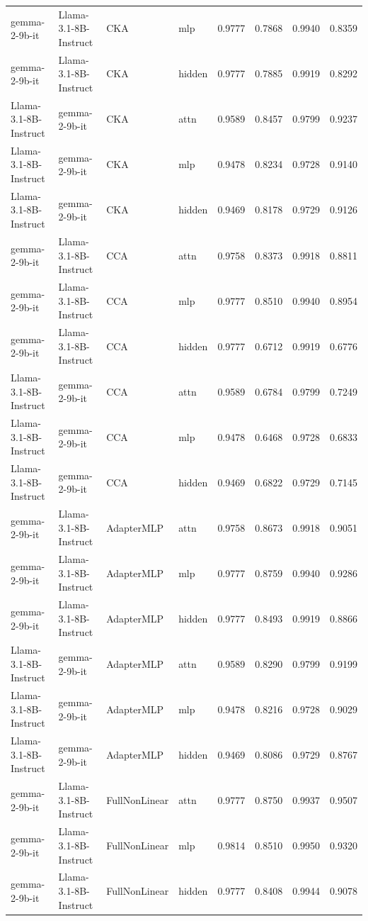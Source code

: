 {\begin{tabularx}{\textwidth}{XXXlcccc}
gemma-2-9b-it & Llama-3.1-8B-Instruct & CKA & mlp & 0.9777 & 0.7868 & 0.9940 & 0.8359 \\
gemma-2-9b-it & Llama-3.1-8B-Instruct & CKA & hidden & 0.9777 & 0.7885 & 0.9919 & 0.8292 \\
Llama-3.1-8B-Instruct & gemma-2-9b-it & CKA & attn & 0.9589 & 0.8457 & 0.9799 & 0.9237 \\
Llama-3.1-8B-Instruct & gemma-2-9b-it & CKA & mlp & 0.9478 & 0.8234 & 0.9728 & 0.9140 \\
Llama-3.1-8B-Instruct & gemma-2-9b-it & CKA & hidden & 0.9469 & 0.8178 & 0.9729 & 0.9126 \\
\midrule
gemma-2-9b-it & Llama-3.1-8B-Instruct & CCA & attn & 0.9758 & 0.8373 & 0.9918 & 0.8811 \\
gemma-2-9b-it & Llama-3.1-8B-Instruct & CCA & mlp & 0.9777 & 0.8510 & 0.9940 & 0.8954 \\
gemma-2-9b-it & Llama-3.1-8B-Instruct & CCA & hidden & 0.9777 & 0.6712 & 0.9919 & 0.6776 \\
Llama-3.1-8B-Instruct & gemma-2-9b-it & CCA & attn & 0.9589 & 0.6784 & 0.9799 & 0.7249 \\
Llama-3.1-8B-Instruct & gemma-2-9b-it & CCA & mlp & 0.9478 & 0.6468 & 0.9728 & 0.6833 \\
Llama-3.1-8B-Instruct & gemma-2-9b-it & CCA & hidden & 0.9469 & 0.6822 & 0.9729 & 0.7145 \\
\midrule
gemma-2-9b-it & Llama-3.1-8B-Instruct & AdapterMLP & attn & 0.9758 & 0.8673 & 0.9918 & 0.9051 \\
gemma-2-9b-it & Llama-3.1-8B-Instruct & AdapterMLP & mlp & 0.9777 & 0.8759 & 0.9940 & 0.9286 \\
gemma-2-9b-it & Llama-3.1-8B-Instruct & AdapterMLP & hidden & 0.9777 & 0.8493 & 0.9919 & 0.8866 \\
Llama-3.1-8B-Instruct & gemma-2-9b-it & AdapterMLP & attn & 0.9589 & 0.8290 & 0.9799 & 0.9199 \\
Llama-3.1-8B-Instruct & gemma-2-9b-it & AdapterMLP & mlp & 0.9478 & 0.8216 & 0.9728 & 0.9029 \\
Llama-3.1-8B-Instruct & gemma-2-9b-it & AdapterMLP & hidden & 0.9469 & 0.8086 & 0.9729 & 0.8767 \\
\midrule
gemma-2-9b-it & Llama-3.1-8B-Instruct & FullNonLinear & attn & 0.9777 & 0.8750 & 0.9937 & 0.9507 \\
gemma-2-9b-it & Llama-3.1-8B-Instruct & FullNonLinear & mlp & 0.9814 & 0.8510 & 0.9950 & 0.9320 \\
gemma-2-9b-it & Llama-3.1-8B-Instruct & FullNonLinear & hidden & 0.9777 & 0.8408 & 0.9944 & 0.9078 \\

\end{tabularx}}
